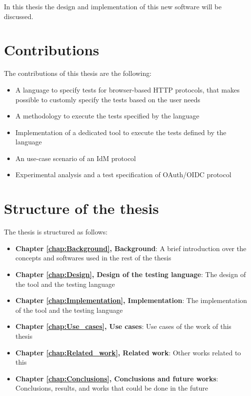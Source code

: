In this thesis the design and implementation of this new software will be discussed.

\section{Contributions}
\label{sec:contributions}
The contributions of this thesis are the following:
\begin{itemize}
    \item A language to specify tests for browser-based HTTP protocols, that makes possible to customly specify the tests based on the user needs
    \item A methodology to execute the tests specified by the language
    \item Implementation of a dedicated tool to execute the tests defined by the language
    \item An use-case scenario of an IdM protocol
    \item Experimental analysis and a test specification of OAuth/OIDC protocol
\end{itemize}

\section{Structure of the thesis}
The thesis is structured as follows:
\begin{itemize}
    \item \textbf{Chapter \ref{chap:Background}, Background}: A brief introduction over the concepts and softwares used in the rest of the thesis
    \item \textbf{Chapter \ref{chap:Design}, Design of the testing language}: The design of the tool and the testing language
    \item \textbf{Chapter \ref{chap:Implementation}, Implementation}: The implementation of the tool and the testing language
    \item \textbf{Chapter \ref{chap:Use_cases}, Use cases}: Use cases of the work of this thesis
    \item \textbf{Chapter \ref{chap:Related_work}, Related work}: Other works related to this
    \item \textbf{Chapter \ref{chap:Conclusions}, Conclusions and future works}: Conclusions, results, and works that could be done in the future
\end{itemize}




